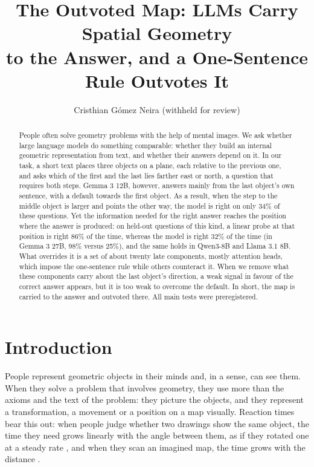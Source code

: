 \documentclass[10pt]{article}
\title{The Outvoted Map: LLMs Carry Spatial Geometry\\ to the Answer, and a One-Sentence Rule Outvotes It}
\author{\name Cristhian G\'omez Neira \email (withheld for review)}
\begin{document}
\maketitle

\begin{abstract}
People often solve geometry problems with the help of mental images. We ask whether large language models do
something comparable: whether they build an internal geometric representation from text, and whether their answers
depend on it. In our task, a short text places three objects on a plane, each relative to the previous one, and asks
which of the first and the last lies farther east or north, a question that requires both steps. Gemma 3 12B, however, answers mainly from the last object's own sentence, with a default towards the first object. As a result, when the step to the
middle object is larger and points the other way, the model is right on only 34\% of these questions. Yet the
information needed for the right answer reaches the position where the answer is produced: on held-out questions of
this kind, a linear probe at that position is right 86\% of the time, whereas the model is right 32\% of the time (in
Gemma 3 27B, 98\% versus 25\%), and the same holds in Qwen3-8B and Llama 3.1 8B. What overrides it is a set of about twenty late components, mostly attention heads, which impose the one-sentence rule while others counteract it. When we remove what these components carry about the last object's direction, a weak
signal in favour of the correct answer appears, but it is too weak to overcome the default. In short, the map is carried to the answer and outvoted there. All main tests were preregistered.
\end{abstract}

\section{Introduction}
People represent geometric objects in their minds and, in a sense, can see them. When they solve a problem that
involves geometry, they use more than the axioms and the text of the problem: they picture the objects, and they
represent a transformation, a movement or a position on a map visually. Reaction times bear this out: when people judge whether two drawings show the same object, the time they need grows linearly with the angle between them, as if
they rotated one at a steady rate \citep{shepard1971rotation}, and when they scan an imagined map, the time grows with
the distance \citep{kosslyn1978scanning}.
\end{document}
